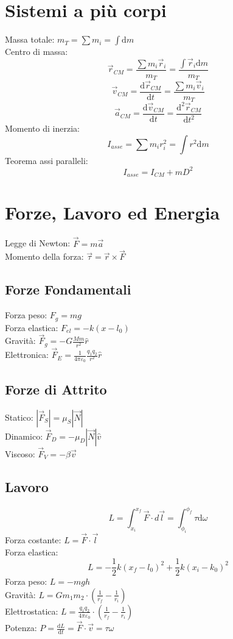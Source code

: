 \documentclass{article}
\begin{document}
\begin{small}
\begin{multicols}{3}
\section{Sistemi a più corpi}
		Massa totale: $ m_T = \sum m_i = \int \mathrm d m $ \\
		Centro di massa:
		\[ \vec r_{CM} = \frac{ \sum m_i \vec r_i }{ m_T } = \frac{ \int \vec r_i \mathrm d m }{ m_T } \]
		\[ \vec v_{CM} = \frac{ \mathrm d \vec r_{CM} }{ \mathrm d t } = \frac{ \sum m_i \vec v_i}{ m_T } \]
		\[ \vec a_{CM} = \frac{ \mathrm d \vec v_{CM} }{ \mathrm d t } = \frac{ \mathrm d^2 \vec r_{CM} }{ \mathrm d t^2 } \]
		Momento di inerzia:
		\[ I_{asse} = \sum m_i r_i^2 = \int r^2 \mathrm d m \]
		Teorema assi paralleli:
		\[ I_{asse} = I_{CM} + m D^2 \]
\section{Forze, Lavoro ed Energia}
		Legge di Newton: $ \vec F = m \vec a $ \\
		Momento della forza: $ \vec \tau = \vec r \times \vec F $
	\subsection{Forze Fondamentali}
		Forza peso: $ F_g = m g $ \\
		Forza elastica: $ F_{el} = - k ( x - l_0 ) $ \\
		Gravità: $ \vec F_g = - G \frac{ M m }{ r^2 } \hat r $ \\
		Elettronica: $ \vec F_E = \frac{1}{ 4 \pi \varepsilon_0 } \frac{ q_1 q_2 }{ r^2 } \hat r $
	\subsection{Forze di Attrito}
		Statico: $ | \vec F_S | = \mu_S | \vec N | $ \\
		Dinamico: $ \vec F_D = - \mu_D | \vec N | \hat v $ \\
		Viscoso: $ \vec F_V = - \beta \vec v $
	\subsection{Lavoro}
		\[ L = \int_{x_i}^{x_f} \vec F \cdot d \vec l = \int_{\phi_i}^{\phi_f} \tau \mathrm d \omega \]
		Forza costante: $ L = \vec F \cdot \vec l $ \\
		Forza elastica:
		\[ L = - \frac{1}{2} k (x_f - l_0)^2 + \frac{1}{2} k (x_i - k_0)^2 \]
		Forza peso: $ L = - m g h $ \\
		Gravità: $ L = G m_1 m_2 \cdot ( \frac{1}{ r_f } - \frac{1}{ r_i } ) $ \\
		Elettrostatica: $ L = \frac{ q_1 q_2 }{ 4 \pi \varepsilon_0 } \cdot ( \frac{1}{ r_f } - \frac{1}{ r_i } ) $ \\
		Potenza: $ P = \frac{ \mathrm d L }{ \mathrm d t } = \vec F \cdot \vec v = \tau \omega $

\end{multicols}
\end{small}
\end{document}
